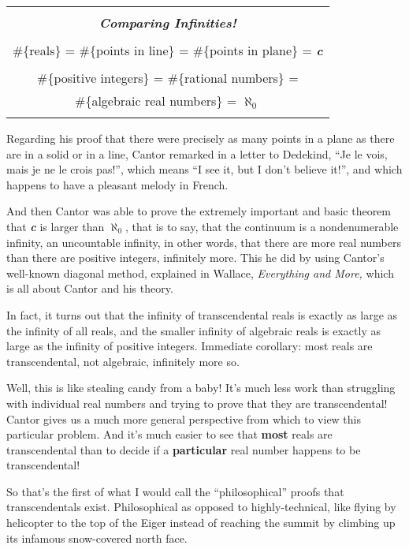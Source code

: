 \documentclass[12pt]{book}
\begin{document}
\begin{center}
\begin{tabular}{|c|}
\hline
\\
\textbf{\emph{\large Comparing Infinities!}}
\\ \\
\#\{reals\} = \#\{points in line\} = \#\{points in plane\} = \textbf{\emph{c}}
\\ \\
\#\{positive integers\} = \#\{rational numbers\} = 
\\
\#\{algebraic real numbers\} = $\aleph_0$
\\
\\
\hline
\end{tabular}
\end{center}
 
Regarding his proof that there were precisely as many points in a plane as 
there are in a solid or in a line,
Cantor remarked in a letter to Dedekind, ``Je le vois, mais je ne le crois pas!'',
which means ``I see it, but I don't believe it!'', and which happens to have a pleasant melody 
in French.
 
And then Cantor was able to prove the extremely important and basic theorem that
\textbf{\emph{c}} is larger than $\aleph_0$, 
that is to say, that the continuum is a nondenumerable infinity, 
an uncountable infinity, in other words,
that there are
more real numbers than there are positive integers, infinitely more.
This he did by using Cantor's well-known diagonal method, 
explained in Wallace, \emph{Everything and More,}
which is all about Cantor and his theory.
 
In fact, it turns out that
the infinity of transcendental reals is exactly as large as the infinity of all reals,
and the smaller infinity of algebraic reals is exactly as large as the infinity of positive integers.
Immediate corollary: most reals are transcendental, not algebraic, infinitely more so.
 
Well, this is like stealing candy from a baby!
It's
much less work than struggling with individual real numbers and trying to prove that they are
transcendental!
Cantor gives us a much more general perspective from which to view this particular problem.
And it's much easier to see that \textbf{most} reals are transcendental 
than to decide if a \textbf{particular}
real number happens to be transcendental!
 
So that's the first of what I would call the ``philosophical'' proofs that transcendentals exist.
Philosophical as opposed to highly-technical, like flying by helicopter to the top of the
Eiger instead of reaching the summit by 
climbing up its infamous snow-covered north face.
 
\end{document}
